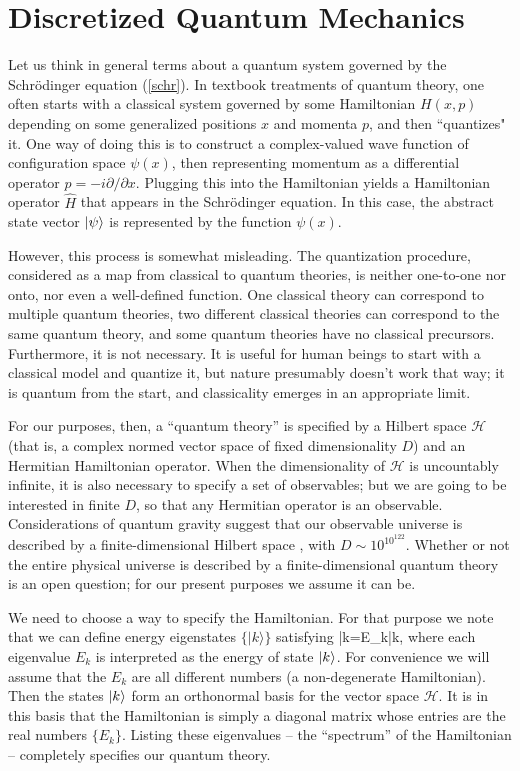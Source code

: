 \documentclass[aps,prd,twocolumn,nofootinbib,notitlepage]{revtex4-1}
\begin{document}
\section{Discretized Quantum Mechanics}

Let us think in general terms about a quantum system governed by the Schr\"odinger equation (\ref{schr}).
In textbook treatments of quantum theory, one often starts with a classical system governed by some Hamiltonian $H(x,p)$ depending on some generalized positions $x$ and momenta $p$, and then ``quantizes" it. 
One way of doing this is to construct a complex-valued wave function of configuration space $\psi(x)$, then representing momentum as a differential operator $\hat{p} = -i \partial/\partial x$.
Plugging this into the Hamiltonian yields a Hamiltonian operator $\hat{H}$ that appears in the Schr\"odinger equation.
In this case, the abstract state vector $\lvert \psi\rangle$ is represented by the function $\psi(x)$.

However, this process is somewhat misleading.
The quantization procedure, considered as a map from classical to quantum theories, is neither one-to-one nor onto, nor even a well-defined function.
One classical theory can correspond to multiple quantum theories, two different classical theories can correspond to the same quantum theory, and some quantum theories have no classical precursors.
Furthermore, it is not necessary.
It is useful for human beings to start with a classical model and quantize it, but nature presumably doesn't work that way; it is quantum from the start, and classicality emerges in an appropriate limit.

For our purposes, then, a ``quantum theory'' is specified by a Hilbert space $\mathcal H$ (that is, a complex normed vector space of fixed dimensionality $D$) and an Hermitian Hamiltonian operator.
When the dimensionality of $\mathcal H$ is uncountably infinite, it is also necessary to specify a set of observables; but we are going to be interested in finite $D$, so that any Hermitian operator is an observable.
Considerations of quantum gravity suggest that our observable universe is described by a finite-dimensional Hilbert space \cite{Bao:2017rnv}, with $D\sim 10^{10^{122}}$.
Whether or not the entire physical universe is described by a finite-dimensional quantum theory is an open question; for our present purposes we assume it can be.

We need to choose a way to specify the Hamiltonian.
For that purpose we note that we can define energy eigenstates  $\{|k\rangle\}$ satisfying 
\be
  \left|k\right\rangle=E_k\left|k\right\rangle,
  \label{eigenbasis}
\ee
where each eigenvalue $E_k$ is interpreted as the energy of state $\lvert k\rangle$.
For convenience we will assume that the $E_k$ are all different numbers (a non-degenerate Hamiltonian).
Then the states $\lvert k\rangle$ form an orthonormal basis for the vector space $\mathcal H$.
It is in this basis that the Hamiltonian is simply a diagonal matrix whose entries are the real numbers $\{E_k\}$.
Listing these eigenvalues -- the ``spectrum'' of the Hamiltonian -- completely specifies our quantum theory.
\end{document}
